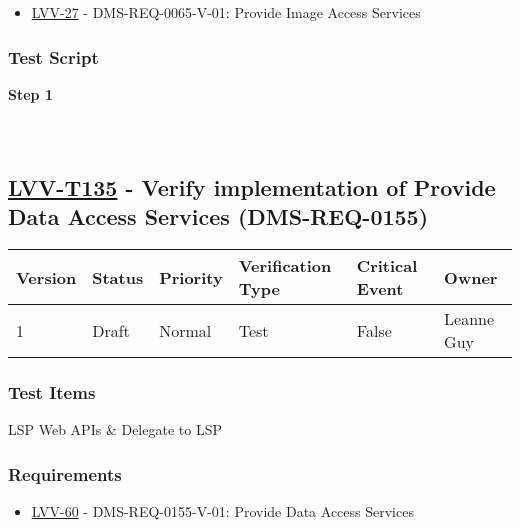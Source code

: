 \begin{itemize}
\tightlist
\item
  \href{https://jira.lsstcorp.org/browse/LVV-27}{LVV-27} -
  DMS-REQ-0065-V-01: Provide Image Access Services
\end{itemize}

\hypertarget{test-script-111}{%
\subsubsection{Test Script}\label{test-script-111}}

\textbf{Step 1}\\
~\\
~\\

\hypertarget{lvv-t135---verify-implementation-of-provide-data-access-services-dms-req-0155}{%
\subsection{\texorpdfstring{\href{https://jira.lsstcorp.org/secure/Tests.jspa\#/testCase/LVV-T135}{LVV-T135}
- Verify implementation of Provide Data Access Services
(DMS-REQ-0155)}{LVV-T135 - Verify implementation of Provide Data Access Services (DMS-REQ-0155)}}\label{lvv-t135---verify-implementation-of-provide-data-access-services-dms-req-0155}}

\begin{longtable}[]{@{}llllll@{}}
\toprule
Version & Status & Priority & Verification Type & Critical Event &
Owner\tabularnewline
\midrule
\endhead
1 & Draft & Normal & Test & False & Leanne Guy\tabularnewline
\bottomrule
\end{longtable}

\hypertarget{test-items-111}{%
\subsubsection{Test Items}\label{test-items-111}}

LSP Web APIs \& Delegate to LSP

\hypertarget{requirements-112}{%
\subsubsection{Requirements}\label{requirements-112}}

\begin{itemize}
\tightlist
\item
  \href{https://jira.lsstcorp.org/browse/LVV-60}{LVV-60} -
  DMS-REQ-0155-V-01: Provide Data Access Services
\end{itemize}

